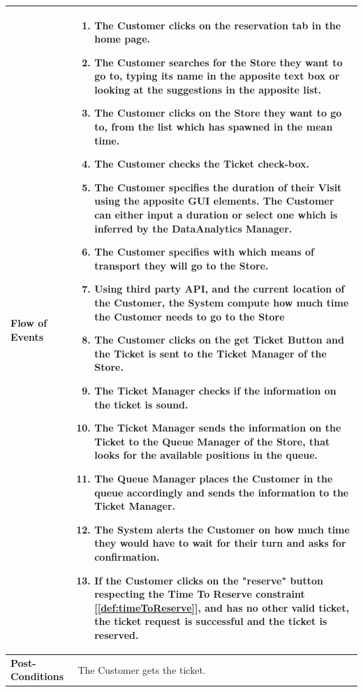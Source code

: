 \documentclass[a4paper, 12pt, oneside]{article}
\begin{document}
\begin{tabularx}{\linewidth}{| l | X |}
	\hline
	\textbf{Flow of Events} & \parbox{0.7\textwidth}{	
		\begin{enumerate}
		    \item The Customer clicks on the reservation tab in the home page.
			\item The Customer searches for the Store they want to go to, typing its name in the apposite text box or looking at the suggestions in the apposite list.
			\item The Customer clicks on the Store they want to go to, from the list which has spawned in the mean time.
			\item The Customer checks the Ticket check-box.
			\item The Customer specifies the duration of their Visit using the apposite GUI elements. The Customer can either input a duration or select one which is inferred by the DataAnalytics Manager.
			\item The Customer specifies with which means of transport they will go to the Store.
			\item Using third party API, and the current location of the Customer, the System compute how much time the Customer needs to go to the Store
			\item The Customer clicks on the get Ticket Button and the Ticket is sent to the Ticket Manager of the Store.
			\item The Ticket Manager checks if the information on the ticket is sound.
			\item The Ticket Manager sends the information on the Ticket to the Queue Manager of the Store, that looks for the available positions in the queue.
			\item The Queue Manager places the Customer in the queue accordingly and sends the information to the Ticket Manager.
			\item The System alerts the Customer on how much time they would have to wait for their turn and asks for confirmation.
			\item If the Customer clicks on the "reserve" button respecting the Time To Reserve constraint [\ref{def:timeToReserve}], and has no other valid ticket, the ticket request is successful and the ticket is reserved.
	\end{enumerate}}\\
	
	\hline
	\textbf{Post-Conditions} & The Customer gets the ticket.\\
	

\end{tabularx}
\end{document}
